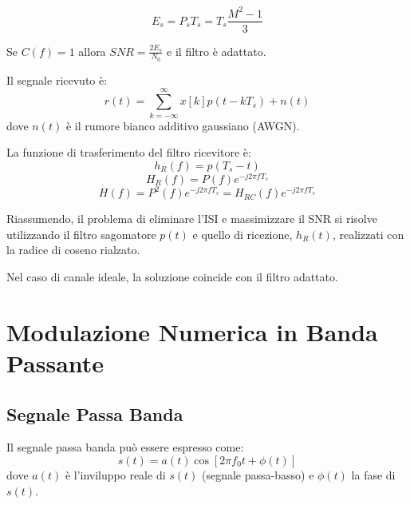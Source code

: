 \documentclass{article}
\begin{document}
\[
E_s = P_s T_s = T_s \frac{M^2-1}{3}
\]

Se \( C(f) = 1 \) allora \( SNR = \frac{2 E_s}{N_0} \) e il filtro è adattato.

Il segnale ricevuto è:
\[
r(t) = \sum_{k=-\infty}^{\infty} x[k] p(t - kT_s) + n(t)
\]
dove \( n(t) \) è il rumore bianco additivo gaussiano (AWGN).

La funzione di trasferimento del filtro ricevitore è:
\[
h_{R}(f) = p (T_s - t)
\]
\[
H_{R}(f) = P(f) e^{-j2\pi fT_s}
\]
\[
H(f) = P^2(f) e^{-j2\pi fT_s} = H_{RC}(f) e^{-j2\pi fT_s}
\]

Riassumendo, il problema di eliminare l'ISI e massimizzare il SNR si risolve utilizzando il filtro sagomatore \( p(t) \) e quello di ricezione, \( h_R(t) \), realizzati con la radice di coseno rialzato.

Nel caso di canale ideale, la soluzione coincide con il filtro adattato.



\section*{Modulazione Numerica in Banda Passante}

\subsection*{Segnale Passa Banda}

Il segnale passa banda può essere espresso come:
\[
s(t) = a(t) \cos[2\pi f_0 t + \phi(t)]
\]
dove \( a(t) \) è l'inviluppo reale di \( s(t) \) (segnale passa-basso) e \( \phi(t) \) la fase di \( s(t) \).



\end{document}
